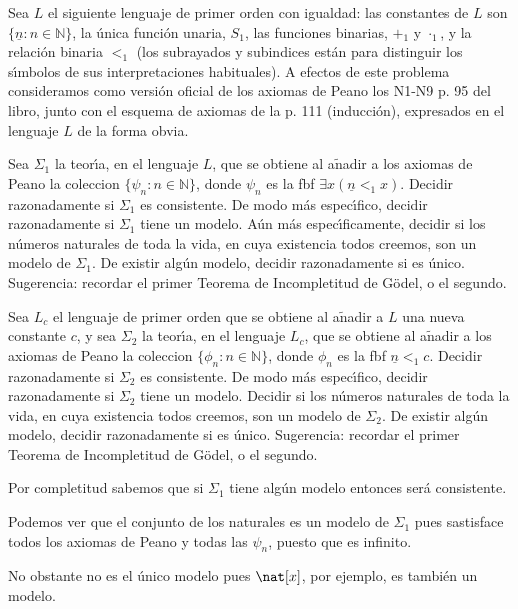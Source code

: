 \begin{problem}
Sea  $L$  el siguiente lenguaje de primer orden  con igualdad: las constantes de $L$ son
$\{\underline{n}: n\in\mathbb{N}\}$, la \'unica funci\'on unaria, $S_1$, las funciones binarias,
$+_1$ y $\cdot_1$, y la relaci\'on binaria $<_1$ (los subrayados y subindices est\'an para
distinguir los s\'{\i}mbolos de sus interpretaciones habituales). A efectos de este problema
consideramos como versi\'on oficial de los axiomas de Peano los N1-N9 p. 95 del libro, junto con el esquema
de axiomas de la p. 111 (inducci\'on), expresados en el lenguaje $L$ de la forma
obvia.

\ppart Sea $\Sigma_1$ la teor\'{\i}a,
 en el lenguaje $L$, que se obtiene al a$\operatorname{\tilde{n}}$adir a los
axiomas de Peano la coleccion $\{ \psi_n: n\in\mathbb{N}\}$, donde
$\psi_n$ es la fbf $\exists x (\underline{n} <_1 x )$.
 Decidir razonadamente si
$\Sigma_1$ es consistente. De modo m\'as espec\'{\i}fico, decidir razonadamente si $\Sigma_1$ tiene un modelo.  A\'un m\'as espec\'{\i}ficamente, decidir si los n\'umeros naturales
de toda la vida, en cuya existencia todos creemos,  son un modelo de $\Sigma_1$.
De existir alg\'un modelo, decidir razonadamente si es \'unico.
Sugerencia: recordar el primer Teorema de Incompletitud de G\"odel, o el segundo.

\ppart Sea $L_c$ el lenguaje de primer orden que se obtiene al a$\operatorname{\tilde{n}}$adir
a $L$ una nueva constante $c$, y sea
$\Sigma_2$ la teor\'{\i}a,
 en el lenguaje $L_c$, que se obtiene al a$\operatorname{\tilde{n}}$adir a los
axiomas de Peano la coleccion $\{ \phi_n: n\in\mathbb{N}\}$, donde
$\phi_n$ es la fbf $\underline{n} <_1 c$.
Decidir razonadamente si
$\Sigma_2$ es consistente. De modo m\'as espec\'{\i}fico, decidir razonadamente si $\Sigma_2$ tiene un modelo.  Decidir si los n\'umeros naturales
de toda la vida, en cuya existencia todos creemos,  son un modelo de $\Sigma_2$.
De existir alg\'un modelo, decidir razonadamente si es \'unico.
Sugerencia: recordar el primer Teorema de Incompletitud de G\"odel, o el segundo.
\solution
\spart

Por completitud sabemos que si $Σ_1$ tiene algún modelo entonces será consistente.

Podemos ver que el conjunto de los naturales es un modelo de $Σ_1$ pues sastisface todos los axiomas de Peano y todas las $\psi_n$, puesto que es infinito.

No obstante no es el único modelo pues $\nat[x]$, por ejemplo, es también un modelo.


\end{problem}
